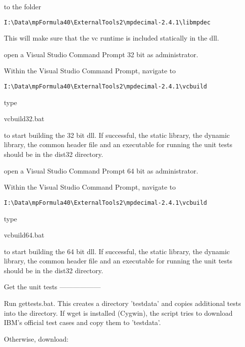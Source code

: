 to the folder

\begin{verbatim}
I:\Data\mpFormula40\ExternalTools2\mpdecimal-2.4.1\libmpdec
\end{verbatim}



This will make sure that the vc runtime is included statically in the dll.



open a Visual Studio Command Prompt 32 bit as administrator.

Within the Visual Studio Command Prompt, navigate to

\begin{verbatim}
I:\Data\mpFormula40\ExternalTools2\mpdecimal-2.4.1\vcbuild
\end{verbatim}



type 

vcbuild32.bat

to start building the 32 bit dll. If successful, the static library, the dynamic
library, the common header file and an executable for running the
unit tests should be in the dist32 directory.





open a Visual Studio Command Prompt 64 bit as administrator.

Within the Visual Studio Command Prompt, navigate to

\begin{verbatim}
I:\Data\mpFormula40\ExternalTools2\mpdecimal-2.4.1\vcbuild
\end{verbatim}



type 

vcbuild64.bat

to start building the 64 bit dll. If successful, the static library, the dynamic
library, the common header file and an executable for running the
unit tests should be in the dist32 directory.





Get the unit tests
------------------

Run gettests.bat. This creates a directory 'testdata' and copies
additional tests into the directory. If wget is installed (Cygwin),
the script tries to download IBM's official test cases and copy them
to 'testdata'.

Otherwise, download:

